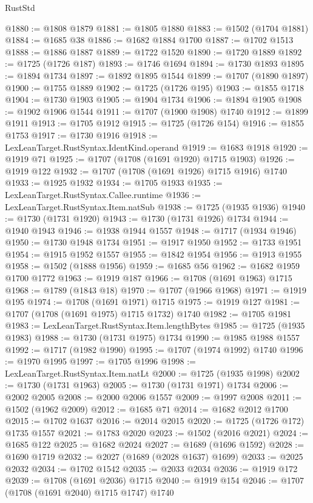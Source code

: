 \begin{lexlean}{RustStd}
\begin{coremodule}
@1880 := @1808 @1879
@1881 := @1805 @1880
@1883 := @1502 (@1704 @1881)
@1884 := @1685 @38
@1886 := @1682 @1884 @1700
@1887 := @1702 @1513
@1888 := @1886 @1887
@1889 := @1722 @1520
@1890 := @1720 @1889
@1892 := @1725 (@1726 @187)
@1893 := @1746 @1694
@1894 := @1730 @1893
@1895 := @1894 @1734
@1897 := @1892 @1895 @1544
@1899 := @1707 (@1890 @1897)
@1900 := @1755 @1889
@1902 := @1725 (@1726 @195)
@1903 := @1855 @1718
@1904 := @1730 @1903
@1905 := @1904 @1734
@1906 := @1894 @1905
@1908 := @1902 @1906 @1544
@1911 := @1707 (@1900 @1908) @1740
@1912 := @1899 @1911
@1913 := @1705 @1912
@1915 := @1725 (@1726 @154)
@1916 := @1855 @1753
@1917 := @1730 @1916
@1918 := LexLeanTarget.RustSyntax.IdentKind.operand
@1919 := @1683 @1918
@1920 := @1919 @71
@1925 := @1707 (@1708 (@1691 @1920) @1715 @1903)
@1926 := @1919 @122
@1932 := @1707 (@1708 (@1691 @1926) @1715 @1916) @1740
@1933 := @1925 @1932
@1934 := @1705 @1933
@1935 := LexLeanTarget.RustSyntax.Callee.runtime
@1936 := LexLeanTarget.RustSyntax.Item.natSub
@1938 := @1725 (@1935 @1936)
@1940 := @1730 (@1731 @1920)
@1943 := @1730 (@1731 @1926) @1734
@1944 := @1940 @1943
@1946 := @1938 @1944 @1557
@1948 := @1717 (@1934 @1946)
@1950 := @1730 @1948 @1734
@1951 := @1917 @1950
@1952 := @1733 @1951
@1954 := @1915 @1952 @1557
@1955 := @1842 @1954
@1956 := @1913 @1955
@1958 := @1502 (@1888 @1956)
@1959 := @1685 @56
@1962 := @1682 @1959 @1700 @1772
@1963 := @1919 @187
@1966 := @1708 (@1691 @1963) @1715
@1968 := @1789 (@1843 @18)
@1970 := @1707 (@1966 @1968)
@1971 := @1919 @195
@1974 := @1708 (@1691 @1971) @1715
@1975 := @1919 @127
@1981 := @1707 (@1708 (@1691 @1975) @1715 @1732) @1740
@1982 := @1705 @1981
@1983 := LexLeanTarget.RustSyntax.Item.lengthBytes
@1985 := @1725 (@1935 @1983)
@1988 := @1730 (@1731 @1975) @1734
@1990 := @1985 @1988 @1557
@1992 := @1717 (@1982 @1990)
@1995 := @1707 (@1974 @1992) @1740
@1996 := @1970 @1995
@1997 := @1705 @1996
@1998 := LexLeanTarget.RustSyntax.Item.natLt
@2000 := @1725 (@1935 @1998)
@2002 := @1730 (@1731 @1963)
@2005 := @1730 (@1731 @1971) @1734
@2006 := @2002 @2005
@2008 := @2000 @2006 @1557
@2009 := @1997 @2008
@2011 := @1502 (@1962 @2009)
@2012 := @1685 @71
@2014 := @1682 @2012 @1700
@2015 := @1702 @1637
@2016 := @2014 @2015
@2020 := @1725 (@1726 @172) @1735 @1557
@2021 := @1783 @2020
@2023 := @1502 (@2016 @2021)
@2024 := @1685 @122
@2025 := @1682 @2024
@2027 := @1689 (@1696 @1592)
@2028 := @1690 @1719
@2032 := @2027 (@1689 (@2028 @1637) @1699)
@2033 := @2025 @2032
@2034 := @1702 @1542
@2035 := @2033 @2034
@2036 := @1919 @172
@2039 := @1708 (@1691 @2036) @1715
@2040 := @1919 @154
@2046 := @1707 (@1708 (@1691 @2040) @1715 @1747) @1740

\end{coremodule}
\end{lexlean}
